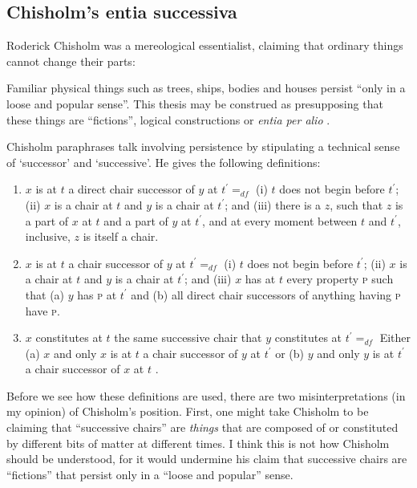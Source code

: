 \documentclass[11pt]{article}
\newenvironment{squote}{%
\begin{spacing}{1}
\begin{list}{}{%
\setlength{\labelwidth}{0pt}%
\rightmargin\leftmargin%
}
\item\relax
}{%
\end{list}%
\end{spacing}
}
\begin{document}
\begin{spacing}{1.5}
\subsection{Chisholm's entia successiva}
\label{chisholm}
Roderick Chisholm was a mereological essentialist, claiming that
ordinary things cannot change their parts:

\begin{squote}
Familiar physical things such as trees, ships, bodies and houses
persist ``only in a loose and popular sense''.  This thesis may be
construed as presupposing that these things are ``fictions'', logical
constructions or {\em entia per alio} \citeyearpar[97]{chisholm1979}.
\end{squote}

Chisholm paraphrases talk involving persistence by stipulating a
technical sense of `successor' and `successive'.  He gives the
following definitions:

\begin{enumerate}[ref=\arabic*]
  \item $x$ is at $t$ a direct chair successor of $y$ at $t^{\prime}
    =_{df}$ (i) $t$ does not begin before $t^{\prime}$; (ii) $x$ is a
    chair at $t$ and $y$ is a chair at $t^{\prime}$; and (iii) there
    is a $z$, such that $z$ is a part of $x$ at $t$ and a part of $y$
    at $t^{\prime}$, and at every moment between $t$ and $t^{\prime}$,
    inclusive, $z$ is itself a chair. \label{suc1}
  \item $x$ is at $t$ a chair successor of $y$ at $t^{\prime} =_{df}$
    (i) $t$ does not begin before $t^{\prime}$; (ii) $x$ is a chair at
    $t$ and $y$ is a chair at $t^{\prime}$; and (iii) $x$ has at $t$
    every property \textsc{p} such that (a) $y$ has \textsc{p} at
    $t^{\prime}$ and (b) all direct chair successors of anything
    having \textsc{p} have \textsc{p}. \label{suc2}
  \item $x$ constitutes at $t$ the same successive chair that $y$
    constitutes at $t^{\prime} =_{df}$ Either (a) $x$ and only $x$ is
    at $t$ a chair successor of $y$ at $t^{\prime}$ or (b) $y$ and
    only $y$ is at $t^{\prime}$ a chair successor of $x$ at $t$
    \citep[99--100]{chisholm1979}. \label{suc3}
\end{enumerate}

Before we see how these definitions are used, there are two
misinterpretations (in my opinion) of Chisholm's position.  First, one
might take Chisholm to be claiming that ``successive chairs'' are {\em
  things} that are composed of or constituted by different bits of
matter at different times.  I think this is not how Chisholm should be
understood, for it would undermine his claim that successive chairs
are ``fictions'' that persist only in a ``loose and popular'' sense.


\end{spacing}
\end{document}
